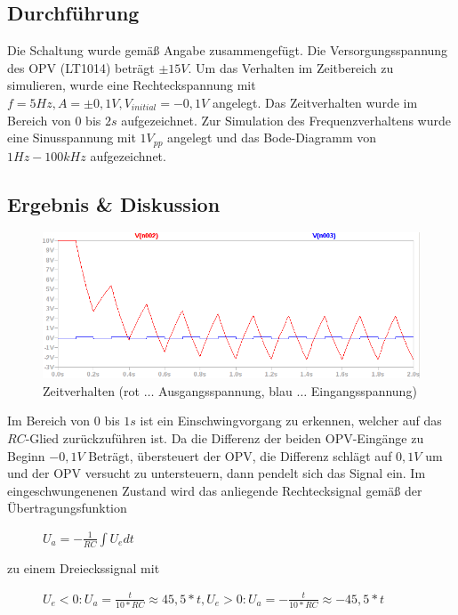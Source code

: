 \documentclass[12pt,a4paper,titlepage]{article}
\begin{document}
\subsection{Durchf\"uhrung}
Die Schaltung wurde gem\"aß Angabe zusammengef\"ugt. Die Versorgungsspannung des OPV (LT1014) betr\"agt $\pm 15V$. Um das Verhalten im Zeitbereich zu simulieren, wurde eine Rechteckspannung mit $f=5Hz, A=\pm 0,1V, V_{initial}=-0,1V$ angelegt. Das Zeitverhalten wurde im Bereich von $0$ bis $2s$ aufgezeichnet. Zur Simulation des Frequenzverhaltens wurde eine Sinusspannung mit $1V_{pp}$ angelegt und das Bode-Diagramm von $1Hz-100kHz$ aufgezeichnet.

\subsection{Ergebnis \& Diskussion}

\begin{figure}[H]
  \centering
  \includegraphics[width=150mm]{integrierer_transient.png}
  \caption{Zeitverhalten (rot $\hdots$ Ausgangsspannung, blau $\hdots$ Eingangsspannung)}
\end{figure}
Im Bereich von $0$ bis $1s$ ist ein Einschwingvorgang zu erkennen, welcher auf das $RC$-Glied zur\"uckzuf\"uhren ist. Da die Differenz der beiden OPV-Eing\"ange zu Beginn $-0,1V$ Betr\"agt, \"ubersteuert der OPV, die Differenz schl\"agt auf $0,1V$ um und der OPV versucht zu untersteuern, dann pendelt sich das Signal ein. Im eingeschwungenenen Zustand wird das anliegende Rechtecksignal gem\"aß der \"Ubertragungsfunktion

\begin{figure}[H]
  \centering
  $U_a = -\frac{1}{RC}\int U_e dt$
\end{figure}

\noindent zu einem Dreieckssignal mit

\begin{figure}[H]
  \centering
  $U_e<0: U_a = \frac{t}{10*RC} \approx 45,5*t, U_e>0: U_a = -\frac{t}{10*RC} \approx -45,5*t$
\end{figure}
\end{document}

